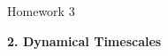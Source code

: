 \documentclass[14pt]{extarticle}
\begin{document}
	\begin{center}
		\Large Homework 3
	\end{center}
	
	\textbf{2. Dynamical Timescales}
\end{document}
